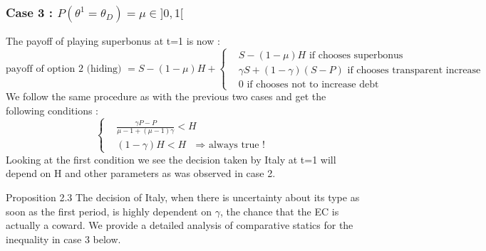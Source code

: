 \documentclass{article}
\begin{document}
\subsubsection*{Case 3 : $P(\theta^1=\theta_D)=\mu\in]0,1[$}
The payoff of playing superbonus at t=1 is now : 
\begin{equation}
\text{payoff of option 2 (hiding) }=S-(1-\mu)H+
\left\{
\begin{aligned}
     &S-(1-\mu)H \text{ if chooses superbonus}\\
     &\gamma S+ (1-\gamma)(S-P) \text{ if chooses transparent increase}\\
     &0 \text{ if chooses not to increase debt}
\end{aligned}
\right.
\end{equation}
We follow the same procedure as with the previous two cases and get the following conditions : 
\begin{equation}
\left\{
\begin{aligned}
    &\frac{\gamma P-P}{\mu-1+(\mu-1)\gamma}<H\\
    &(1-\gamma)H<H \text{ $\Rightarrow$ always true ! }
\end{aligned}
\right.
\end{equation}
Looking at the first condition we see the decision taken by Italy at t=1 will depend on H and other parameters as was observed in case 2. 
\begin{simplebox}{Proposition 2.3}
    The decision of Italy, when there is uncertainty about its type as soon as the first period, is highly dependent on $\gamma$, the chance that the EC is actually a coward. We provide a detailed analysis of comparative statics for the inequality in case 3 below. 
\end{simplebox}
\end{document}
